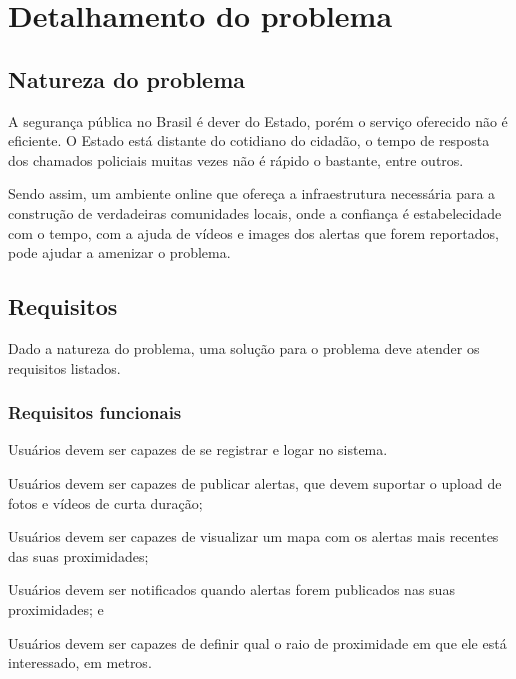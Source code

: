\chapter{Detalhamento do problema}


\section{Natureza do problema}

A segurança pública no Brasil é dever do Estado, porém o serviço oferecido não é eficiente. O Estado está distante do cotidiano do cidadão, o tempo de resposta dos chamados policiais muitas vezes não é rápido o bastante, entre outros.

Sendo assim, um ambiente online que ofereça a infraestrutura necessária para a construção de verdadeiras comunidades locais, onde a confiança é estabelecidade com o tempo, com a ajuda de vídeos e images dos alertas que forem reportados, pode ajudar a amenizar o problema.

\section{Requisitos}

Dado a natureza do problema, uma solução para o problema deve atender os requisitos listados.

\subsection{Requisitos funcionais}

\begin{alineas}
	\item Usuários devem ser capazes de se registrar e logar no sistema.
	\item Usuários devem ser capazes de publicar alertas, que devem suportar o upload de fotos e vídeos de curta duração;
 	\item Usuários devem ser capazes de visualizar um mapa com os alertas mais recentes das suas proximidades;
	\item Usuários devem ser notificados quando alertas forem publicados nas suas proximidades; e
	\item Usuários devem ser capazes de definir qual o raio de proximidade em que ele está interessado, em metros.
\end{alineas}

